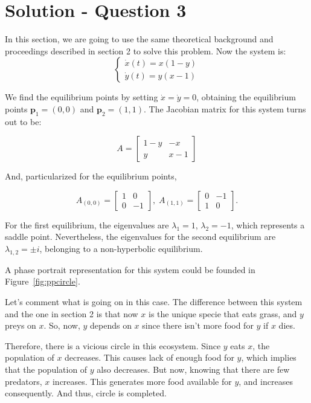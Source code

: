 \section*{Solution - Question 3}
In this section, we are going to use the same theoretical background and proceedings described in section 2 to solve this problem. Now the system is:
$$
    \left\{\begin{aligned} 
      \dot{x}(t) = x(1-y) \\
      \dot{y}(t) = y(x-1)
    \end{aligned}\right.
$$

We find the equilibrium points by setting $\dot{x}=\dot{y}=0$, obtaining the equilibrium points $\mathbf{p}_1 = (0,0)$ and $\mathbf{p}_2 = (1,1)$. The Jacobian matrix for this system turns out to be:

$$
 A=
    \left[\begin{array}{cc}
    1-y  & -x\\
    y & x-1
    \end{array}\right]
    $$

And, particularized for the equilibrium points, 

\begin{equation*}
    A_{(0,0)} =
    \left[\begin{array}{cc}
    1 & 0 \\
    0 & -1
    \end{array}\right], \; 
    A_{(1,1)} =
    \left[\begin{array}{cc}
    0 & -1 \\
    1 & 0
    \end{array}\right].
\end{equation*}

For the first equilibrium, the eigenvalues are $\lambda_1 = 1$, $\lambda_2 = -1$, which represents a saddle point. Nevertheless, the eigenvalues for the second equilibrium are $\lambda_{1,2} = \pm i$, belonging to a non-hyperbolic equilibrium.

A phase portrait representation for this system could be founded in Figure~\ref{fig:ppcircle}. 

Let's comment what is going on in this case. The difference between this system and the one in section 2 is that now $x$ is the unique specie that eats grass, and $y$ preys on $x$. So, now, $y$ depends on $x$ since there isn't more food for $y$ if $x$ dies. 

Therefore, there is a vicious circle in this ecosystem. Since $y$ eats $x$, the population of $x$ decreases. This causes lack of enough food for $y$, which implies that the population of $y$ also decreases. But now, knowing that there are few predators, $x$ increases. This generates more food available for $y$, and increases consequently. And thus, circle is completed.